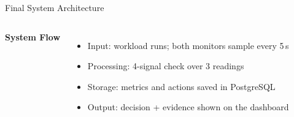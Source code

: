 \documentclass[aspectratio=169,11pt]{beamer}
\begin{document}
\begin{frame}{Final System Architecture}
\begin{columns}[T,totalwidth=\textwidth]

\textbf{\color{GEUBlue}System Flow}

\begin{itemize}\itemsep1pt\small
    \item Input: workload runs; both monitors sample every 5\,s
    \item Processing: 4-signal check over 3 readings
    \item Storage: metrics and actions saved in PostgreSQL
    \item Output: decision + evidence shown on the dashboard
\end{itemize}

\end{columns}

\end{frame}
\end{document}
